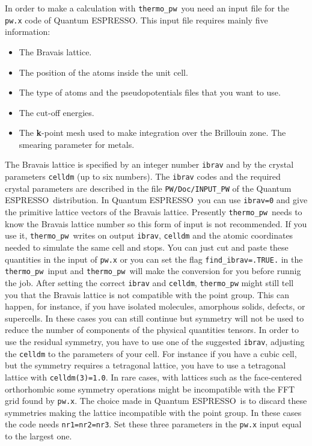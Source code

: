 \documentclass[12pt,a4paper]{article}
\def\qe{{\sc Quantum ESPRESSO}}
\def\thermo{\texttt{thermo\_pw}}
\begin{document}
In order to make a calculation with \thermo\ you need  
an input file for the \texttt{pw.x} code of \qe. This input file
requires mainly five information:
\begin{itemize}
\item The Bravais lattice.

\item The position of the atoms inside the unit cell.

\item The type of atoms and the pseudopotentials files that you want to use.

\item The cut-off energies.

\item The {\bf k}-point mesh used to make integration over
the Brillouin zone. The smearing parameter for metals. 
\end{itemize}

The Bravais lattice is specified by an integer number \texttt{ibrav} and by the
crystal parameters \texttt{celldm} (up to six numbers).  
The \texttt{ibrav} codes and the required crystal parameters 
are described in the file \texttt{PW/Doc/INPUT\_PW} of the 
\qe\ distribution. 
In \qe\ you can use \texttt{ibrav=0} and give the primitive
lattice vectors of the Bravais lattice. Presently \thermo\ needs to
know the Bravais lattice number so this form of input is not recommended. 
If you use it, \thermo\ writes on output \texttt{ibrav}, 
\texttt{celldm} and the atomic coordinates needed to simulate
the same cell and stops.
You can just cut and paste these quantities in the input of \texttt{pw.x}
or you can set the flag \texttt{find\_ibrav=.TRUE.} in the \thermo\ input
and \thermo\ will make the conversion for you before runnig the job. 
After setting the correct
\texttt{ibrav} and \texttt{celldm}, \texttt{thermo\_pw} might still tell you
that the Bravais lattice is not compatible with the point group. This
can happen, for instance, if you have isolated molecules, amorphous solids,
defects, or supercells. In these cases you can still continue but symmetry 
will not be 
used to reduce the number of components of the physical quantities tensors. 
In order to use the residual symmetry, you have to
use one of the suggested \texttt{ibrav}, adjusting the \texttt{celldm} to
the parameters of your cell. For instance if you have a cubic cell, but
the symmetry requires a tetragonal lattice, you have to use a tetragonal
lattice with \texttt{celldm(3)=1.0}.
In rare cases, with lattices such as the face-centered orthorhombic some
symmetry operations might be incompatible with the FFT grid found by 
\texttt{pw.x}. The choice made in \qe\ is to discard these symmetries making
the lattice incompatible with the point group. In these cases the code needs 
\texttt{nr1=nr2=nr3}. Set these three parameters in the \texttt{pw.x} input 
equal to the largest one. 
\end{document}
